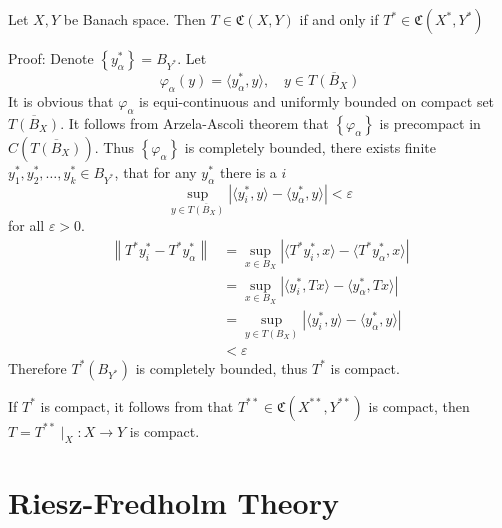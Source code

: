 \documentclass[12pt, oneside]{book}
\begin{document}
\begin{theorem}
    Let $X, Y$ be Banach space. Then $T \in \mathfrak{C}(X,Y)$ if and only if $T^* \in \mathfrak{C}(X^*,Y^*)$

    Proof: Denote $\left\{y_\alpha ^* \right\} = B_{Y^*}$. Let
    \begin{equation*}
        \varphi_\alpha (y) = \langle y_\alpha^*, y\rangle
        ,
        \quad
        y \in \overline{T(B_X)}
    \end{equation*}
    It is obvious that $\varphi_\alpha$ is equi-continuous and uniformly bounded on compact set $\overline{T(B_X)}$. It follows from Arzela-Ascoli theorem that $\left\{\varphi_\alpha\right\}$ is precompact in $C\left(\overline{T(B_X)}\right)$.
    Thus $\left\{\varphi_\alpha\right\}$ is completely bounded, there exists finite $y^*_1, y^*_{2},\ldots, y^*_k \in B_{Y^*}$, that for any $y_\alpha^*$ there is a $i$
    \begin{equation*}
        \sup_{y\in \overline{T(B_X)}} \left|\langle y_i^*,y\rangle-\langle y_\alpha^*,y\rangle\right|
        <
        \varepsilon
    \end{equation*}
    for all $\varepsilon>0$.
    \begin{equation*}
        \begin{aligned}
            \left\| T^*y_i^*-T^*y_\alpha^* \right\|
             & =\sup_{x\in B_X}\left|\langle T^*y_i^*,x\rangle-\langle T^*y_\alpha^*, x\rangle\right| \\
             & =\sup_{x\in B_X} \left|\langle y_i^*,Tx\rangle-\langle y_\alpha^*,Tx\rangle\right|     \\
             & = \sup_{y\in T(B_X)} \left|\langle y_i^*,y\rangle-\langle y_\alpha^*,y\rangle\right|   \\
             & < \varepsilon
        \end{aligned}
    \end{equation*}
    Therefore $T^*(B_{Y^*})$ is completely bounded, thus $T^*$ is compact.

    If $T^*$ is compact, it follows from that $T^{**} \in \mathfrak{C}(X^{**},Y^{**})$ is compact, then $T=T^{**}\mid_{X} : X \rightarrow Y$ is compact.
\end{theorem}



\section{Riesz-Fredholm Theory}
\end{document}
